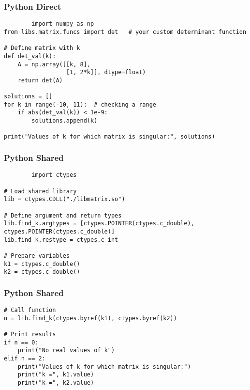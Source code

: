 \documentclass{beamer}
\begin{document}
\begin{frame}[fragile]
    \frametitle{Python Direct}
    \begin{lstlisting}
        import numpy as np
from libs.matrix.funcs import det   # your custom determinant function

# Define matrix with k
def det_val(k):
    A = np.array([[k, 8],
                  [1, 2*k]], dtype=float)
    return det(A)

solutions = []
for k in range(-10, 11):  # checking a range
    if abs(det_val(k)) < 1e-9:
        solutions.append(k)

print("Values of k for which matrix is singular:", solutions)

    \end{lstlisting}
\end{frame}
\begin{frame}[fragile]
    \frametitle{Python Shared}
    \begin{lstlisting}
        import ctypes

# Load shared library
lib = ctypes.CDLL("./libmatrix.so")

# Define argument and return types
lib.find_k.argtypes = [ctypes.POINTER(ctypes.c_double), ctypes.POINTER(ctypes.c_double)]
lib.find_k.restype = ctypes.c_int

# Prepare variables
k1 = ctypes.c_double()
k2 = ctypes.c_double()
  \end{lstlisting}
\end{frame}
\begin{frame}[fragile]
    \frametitle{Python Shared}
    \begin{lstlisting}
# Call function
n = lib.find_k(ctypes.byref(k1), ctypes.byref(k2))

# Print results
if n == 0:
    print("No real values of k")
elif n == 2:
    print("Values of k for which matrix is singular:")
    print("k =", k1.value)
    print("k =", k2.value)

    \end{lstlisting}
\end{frame}
\end{document}
